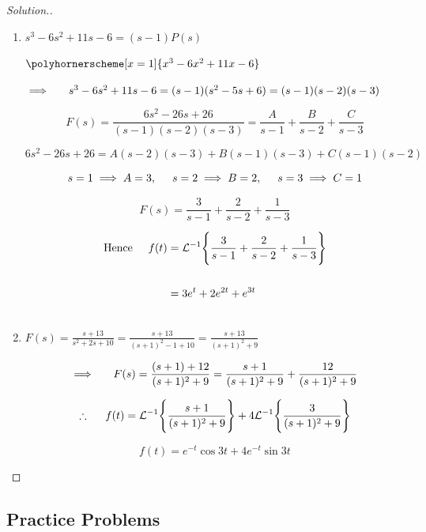\documentclass[11pt,a4paper]{article}
\theoremstyle{definition}
\newenvironment{solution}
  {\renewcommand{\qedsymbol}{}\begin{proof}[\textit{Solution}.]}
  {\end{proof}}
\begin{document}
\begin{solution}
\begin{enumerate}
          \item $\displaystyle{s^3 -6s^2 + 11s -6}= (s-1) P(s)$

$\polyhornerscheme[x =1]{x^3 -6x^2 + 11x -6}$

$\implies \hspace{0.5cm} s^3 -6s^2 + 11s - 6 = (s-1)(s^2 -5s + 6) =(s-1)(s-2)(s-3)$

$$F(s) = \frac{6s^2 -26s + 26}{(s-1)(s-2)(s-3)}  = \frac{A}{s -1} + \frac{B}{s-2} + \frac{C}{s -3}$$ 

$$6s^2 -26s + 26 = A(s-2)(s-3) + B(s-1)(s-3) + C(s-1)(s-2)$$ 

$$s = 1 \implies A = 3,\hspace{0.5cm} s = 2\implies B = 2,\hspace{0.5cm} s = 3\implies C =1$$

$$F(s) = \frac{3}{s -1} + \frac{2}{s-2} + \frac{1}{s-3}$$

\begin{align*}
\text{Hence}\hspace{0.5cm} f(t) & = \mathcal{L}^{-1}\Bigg\{ \frac{3}{s -1} + \frac{2}{s-2} + \frac{1}{s-3}\Bigg\}\\\\
& = 3e^t + 2 e^{2t} + e^{3t}\\\\
\end{align*}      

          \item $\displaystyle{F(s) = \frac{s + 13}{s^2 + 2s + 10}=\frac{s + 13}{(s+1)^2 -1 + 10}=\frac{s + 13}{(s + 1)^2 + 9}}$

          $$\implies \hspace{0.5cm} F(s) = \frac{(s +1) + 12}{(s + 1)^2 + 9} = \frac{s + 1}{(s+1)^2 + 9} + \frac{12}{(s+1)^2 + 9}$$

          $$\therefore \hspace{0.5cm} f(t) = \mathcal{L}^{-1}\Bigg\{\frac{s + 1}{(s + 1)^2 + 9}\Bigg\} + 4\mathcal{L}^{-1}\Bigg\{\frac{3}{(s+1)^2 +9}\Bigg\}$$

        $$f(t) = e^{-t} \cos 3t + 4e^{-t} \sin 3t$$
\end{enumerate}
\end{solution}

\subsection{Practice Problems}
\end{document}
